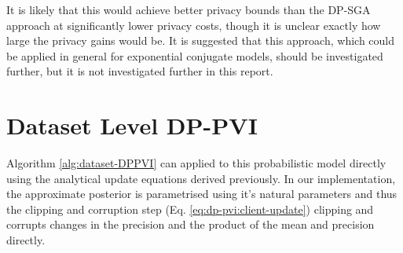It is likely that this would achieve better privacy bounds than the DP-SGA approach at significantly lower privacy costs, though it is unclear exactly how large the privacy gains would be. It is suggested that this approach, which could be applied in general for exponential conjugate models, should be investigated further, but it is not investigated further in this report. 

\section{Dataset Level DP-PVI}
Algorithm \ref{alg:dataset-DPPVI} can applied to this probabilistic model directly using the analytical update equations derived previously. In our implementation, the approximate posterior is parametrised using it's natural parameters and thus the clipping and corruption step (Eq. \ref{eq:dp-pvi:client-update}) clipping and corrupts changes in the precision and the product of the mean and precision directly.  